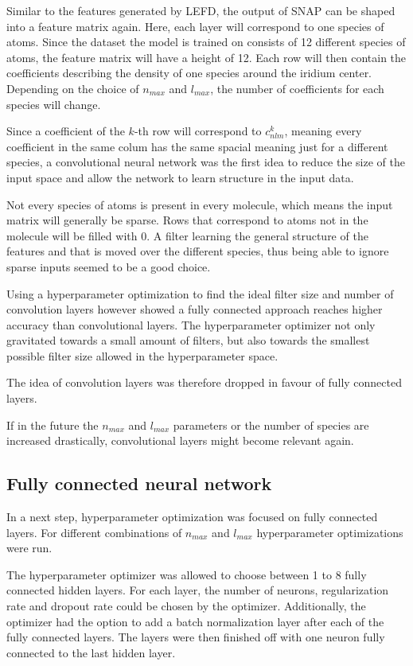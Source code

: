 Similar to the features generated by LEFD, the output of SNAP can be shaped into a feature matrix again.
Here, each layer will correspond to one species of atoms.
Since the dataset the model is trained on consists of 12 different species of atoms, the feature matrix will have a height of 12.
Each row will then contain the coefficients describing the density of one species around the iridium center.
Depending on the choice of $n_{max}$ and $l_{max}$, the number of coefficients for each species will change.

Since a coefficient of the $k$-th row will correspond to $c^k_{nlm}$, meaning every coefficient in the same colum has the same spacial meaning just for a different species,
a convolutional neural network was the first idea to reduce the size of the input space and allow the network to learn structure in the input data.

Not every species of atoms is present in every molecule, which means the input matrix will generally be sparse.
Rows that correspond to atoms not in the molecule will be filled with 0.
A filter learning the general structure of the features and that is moved over the different species, thus
being able to ignore sparse inputs seemed to be a good choice.

Using a hyperparameter optimization to find the ideal filter size and number of convolution layers however showed
a fully connected approach reaches higher accuracy than convolutional layers.
The hyperparameter optimizer not only gravitated towards a small amount of filters, but also towards 
the smallest possible filter size allowed in the hyperparameter space.

The idea of convolution layers was therefore dropped in favour of fully connected layers.

If in the future the $n_{max}$ and $l_{max}$ parameters or the number of species are increased drastically, 
convolutional layers might become relevant again.

\subsection{Fully connected neural network}

In a next step, hyperparameter optimization was focused on fully connected layers.
For different combinations of $n_{max}$ and $l_{max}$ hyperparameter optimizations were run.

The hyperparameter optimizer was allowed to choose between 1 to 8 fully connected hidden layers.
For each layer, the number of neurons, regularization rate and dropout rate could be chosen by the optimizer.
Additionally, the optimizer had the option to add a batch normalization layer after each of the fully connected layers.
The layers were then finished off with one neuron fully connected to the last hidden layer.

